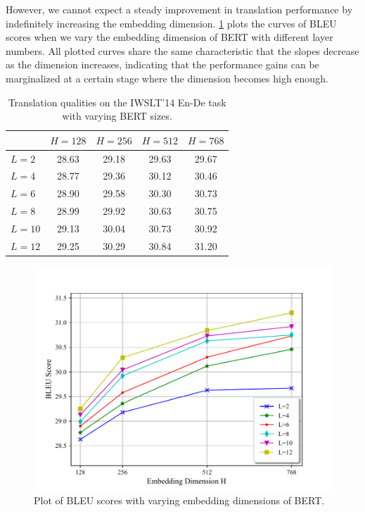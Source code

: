 \documentclass[review]{elsarticle}
\begin{document}
However, we cannot expect a steady improvement in translation performance by indefinitely increasing the embedding dimension.
\cref{fig:vary_size} plots the curves of BLEU scores when we vary the embedding dimension of BERT with different layer numbers.
All plotted curves share the same characteristic that the slopes decrease as the dimension increases, indicating that the performance gains can be marginalized at a certain stage where the dimension becomes high enough.

\begin{table}[ht]
    \caption{Translation qualities on the IWSLT'14 En-De task with varying BERT sizes.}
    \label{tab:vary_size}
    \centering
    \begin{tabular}{lcccc}
        \toprule
                    & $H=128$ & $H=256$ & $H=512$ & $H=768$ \\
        \midrule
        $L=2$   &   28.63   &   29.18   &   29.63   &   29.67   \\
        $L=4$   &   28.77   &   29.36   &   30.12   &   30.46   \\
        $L=6$   &   28.90   &   29.58   &   30.30   &   30.73   \\
        $L=8$   &   28.99   &   29.92   &   30.63   &   30.75   \\
        $L=10$  &   29.13   &   30.04   &   30.73   &   30.92   \\
        $L=12$  &   29.25   &   30.29   &   30.84   &   31.20   \\
        \bottomrule
    \end{tabular}
\end{table}

\begin{figure}[ht]
    \centering
    \includegraphics[width=\columnwidth]{vary_size.pdf}
    \caption{Plot of BLEU scores with varying embedding dimensions of BERT.}
    \label{fig:vary_size}
\end{figure}
\end{document}
